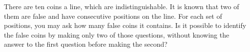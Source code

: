 There are ten coins a line, which are indistinguishable. It is known that two of them are false and have consecutive positions on the line. For each set of positions, you may ask how many false coins it contains. Is it possible to identify the false coins by making only two of those questions, without knowing the answer to the first question before making the second?